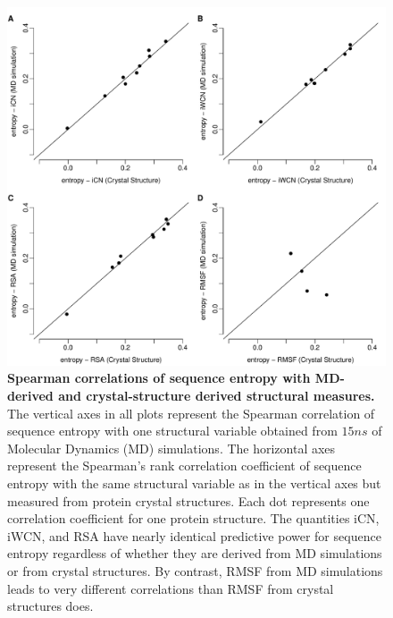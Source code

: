\documentclass[12pt]{article}
\begin{document}
\begin{figure}[tbh]
\begin{center}
    \includegraphics[width=6.5in]{cor_cr_md.pdf}
\end{center}
\caption{\textbf{Spearman correlations of sequence entropy with MD-derived and crystal-structure derived structural measures.}
The vertical axes in all plots represent the Spearman correlation of sequence entropy with one structural variable obtained from $15ns$ of Molecular Dynamics (MD) simulations. The horizontal axes represent the Spearman's rank correlation coefficient of sequence entropy with the same structural variable as in the vertical axes but measured from protein crystal structures. Each dot represents one correlation coefficient for one protein structure. The quantities iCN, iWCN, and RSA have nearly identical predictive power for sequence entropy regardless of whether they are derived from MD simulations or from crystal structures. By contrast, RMSF from MD simulations leads to very different correlations than RMSF from crystal structures does.
}
\label{fig:cor_cr_md}
\end{figure}
\end{document}

